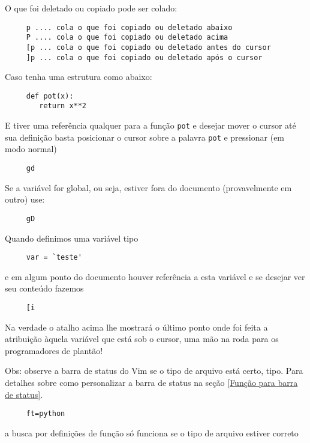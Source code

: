 O que foi deletado ou copiado pode ser colado:

\begin{verbatim}
     p .... cola o que foi copiado ou deletado abaixo
     P .... cola o que foi copiado ou deletado acima
     [p ... cola o que foi copiado ou deletado antes do cursor
     ]p ... cola o que foi copiado ou deletado após o cursor
\end{verbatim}

Caso tenha uma estrutura como abaixo:

\begin{verbatim}
     def pot(x):
        return x**2
\end{verbatim}

E tiver uma referência qualquer para a função \verb+pot+ e desejar
mover o cursor até sua definição basta posicionar o cursor sobre a palavra
\verb+pot+ e pressionar (em modo normal)

\begin{verbatim}
     gd
\end{verbatim}

Se a variável for global, ou seja, estiver fora do documento
(provavelmente em outro) use:

\begin{verbatim}
     gD
\end{verbatim}

Quando definimos uma variável tipo

\begin{verbatim}
     var = `teste'
\end{verbatim}

e em algum ponto do documento houver referência a esta variável e se
desejar ver seu conteúdo fazemos

\begin{verbatim}
     [i
\end{verbatim}
Na verdade o atalho acima lhe mostrará o último ponto onde foi feita
a atribuição àquela variável que está sob o cursor, uma mão na roda
para os programadores de plantão!


Obs: observe a  barra de status do Vim se o tipo de arquivo está certo,
tipo. Para detalhes sobre como personalizar a barra de status na seção
\ref{Função para barra de status}.

\begin{verbatim}
     ft=python
\end{verbatim}

a busca por definições de função só funciona se o tipo de arquivo
estiver correto

